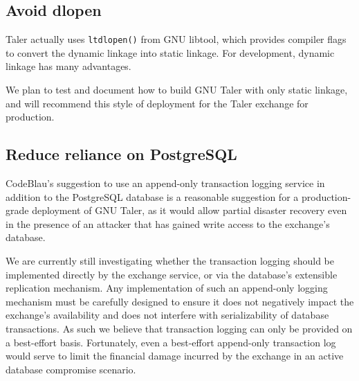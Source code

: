 \documentclass[11pt]{article}
\begin{document}
\subsection{Avoid dlopen}

Taler actually uses {\tt ltdlopen()} from GNU libtool, which provides
compiler flags to convert the dynamic linkage into static linkage.  For
development, dynamic linkage has many advantages.

We plan to test and document how to build GNU Taler with only static
linkage, and will recommend this style of deployment for the Taler
exchange for production.

\subsection{Reduce reliance on PostgreSQL}

CodeBlau's suggestion to use an append-only transaction logging service in
addition to the PostgreSQL database is a reasonable suggestion for a
production-grade deployment of GNU Taler, as it would allow partial disaster
recovery even in the presence of an attacker that has gained write access to
the exchange's database.

We are currently still investigating whether the transaction logging should be
implemented directly by the exchange service, or via the database's extensible
replication mechanism.  Any implementation of such an append-only logging
mechanism must be carefully designed to ensure it does not negatively impact
the exchange's availability and does not interfere with serializability of
database transactions.  As such we believe that transaction logging can only be
provided on a best-effort basis.  Fortunately, even a best-effort append-only
transaction log would serve to limit the financial damage incurred by the
exchange in an active database compromise scenario.
\end{document}
